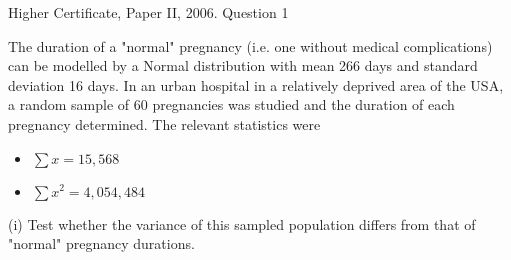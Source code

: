 \documentclass[a4paper,12pt]{article}
\begin{document}
Higher Certificate, Paper II, 2006.  Question 1 
\begin{framed}
\large
The duration of a "normal" pregnancy (i.e. one without medical complications) can be modelled by a Normal distribution with mean 266 days and standard deviation 16 days.  In an urban hospital in a relatively deprived area of the USA, a random sample of 60 pregnancies was studied and the duration of each pregnancy determined.  The relevant statistics were 
 


\begin{itemize}
    \item $\sum x = 15,568$
    \item $\sum x^2 = 4,054,484$
\end{itemize}
 
(i) Test whether the variance of this sampled population differs from that of "normal" pregnancy durations. 
 

\end{framed}

\end{document}
